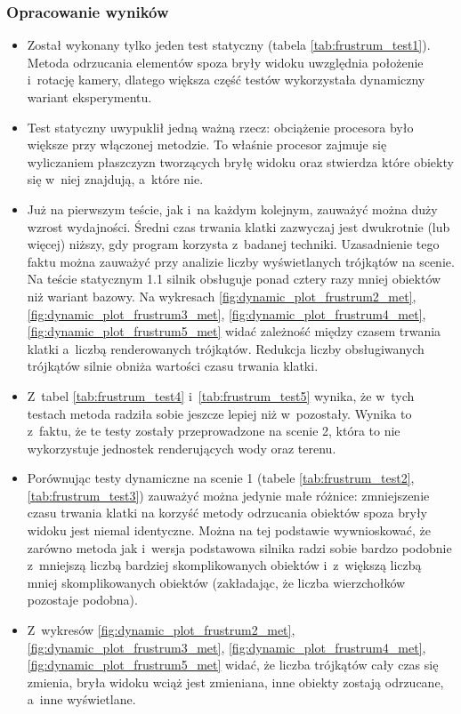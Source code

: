 \documentclass[a4paper,twoside,12pt]{book}
\begin{document}
\subsubsection{Opracowanie wyników}
\begin{itemize}
    \item Został wykonany tylko jeden test statyczny (tabela \ref{tab:frustrum_test1}). Metoda odrzucania elementów spoza bryły widoku uwzględnia położenie i~rotację kamery, dlatego większa część testów wykorzystała dynamiczny wariant eksperymentu.
    \item Test statyczny uwypuklił jedną ważną rzecz: obciążenie procesora było większe przy włączonej metodzie. To właśnie procesor zajmuje się wyliczaniem płaszczyzn tworzących bryłę widoku oraz stwierdza które obiekty się w~niej znajdują, a~które nie.
    \item Już na pierwszym teście, jak i~na każdym kolejnym, zauważyć można duży wzrost wydajności. Średni czas trwania klatki zazwyczaj jest dwukrotnie (lub więcej) niższy, gdy program korzysta z~badanej techniki. Uzasadnienie tego faktu można zauważyć przy analizie liczby wyświetlanych trójkątów na scenie. Na teście statycznym 1.1 silnik obsługuje ponad cztery razy mniej obiektów niż wariant bazowy. Na wykresach \ref{fig:dynamic_plot_frustrum2_met}, \ref{fig:dynamic_plot_frustrum3_met}, \ref{fig:dynamic_plot_frustrum4_met}, \ref{fig:dynamic_plot_frustrum5_met} widać zależność między czasem trwania klatki a~liczbą renderowanych trójkątów. Redukcja liczby obsługiwanych trójkątów silnie obniża wartości czasu trwania klatki.
    \item Z~tabel \ref{tab:frustrum_test4} i~\ref{tab:frustrum_test5} wynika, że w~tych testach metoda radziła sobie jeszcze lepiej niż w~pozostały. Wynika to z~faktu, że te testy zostały przeprowadzone na scenie 2, która to nie wykorzystuje jednostek renderujących wody oraz terenu.
    \item Porównując testy dynamiczne na scenie 1 (tabele \ref{tab:frustrum_test2}, \ref{tab:frustrum_test3}) zauważyć można jedynie małe różnice: zmniejszenie czasu trwania klatki na korzyść metody odrzucania obiektów spoza bryły widoku jest niemal identyczne. Można na tej podstawie wywnioskować, że zarówno metoda jak i~wersja podstawowa silnika radzi sobie bardzo podobnie z~mniejszą liczbą bardziej skomplikowanych obiektów i~z~większą liczbą mniej skomplikowanych obiektów (zakładając, że liczba wierzchołków pozostaje podobna).
    \item Z~wykresów \ref{fig:dynamic_plot_frustrum2_met}, \ref{fig:dynamic_plot_frustrum3_met}, \ref{fig:dynamic_plot_frustrum4_met}, \ref{fig:dynamic_plot_frustrum5_met} widać, że liczba trójkątów cały czas się zmienia, bryła widoku wciąż jest zmieniana, inne obiekty zostają odrzucane, a~inne wyświetlane.

\end{itemize}
\end{document}
